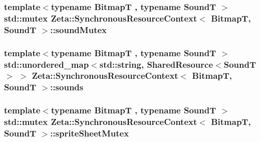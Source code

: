 \hypertarget{classZeta_1_1SynchronousResourceContext_aa7904efdbca71cf9c2bd5eb173f833c5}{
\subsubsection[{sound\+Mutex}]{\setlength{\rightskip}{0pt plus 5cm}template$<$typename Bitmap\+T , typename Sound\+T $>$ std\+::mutex {\bf Zeta\+::\+Synchronous\+Resource\+Context}$<$ Bitmap\+T, Sound\+T $>$\+::sound\+Mutex\hspace{0.3cm}{\ttfamily [private]}}}\label{classZeta_1_1SynchronousResourceContext_aa7904efdbca71cf9c2bd5eb173f833c5}
\hypertarget{classZeta_1_1SynchronousResourceContext_a22e87474e59bc81d6a2cfa5ee98e277e}{
\subsubsection[{sounds}]{\setlength{\rightskip}{0pt plus 5cm}template$<$typename Bitmap\+T , typename Sound\+T $>$ std\+::unordered\+\_\+map$<$std\+::string, {\bf Shared\+Resource}$<$Sound\+T$>$ $>$ {\bf Zeta\+::\+Synchronous\+Resource\+Context}$<$ Bitmap\+T, Sound\+T $>$\+::sounds\hspace{0.3cm}{\ttfamily [private]}}}\label{classZeta_1_1SynchronousResourceContext_a22e87474e59bc81d6a2cfa5ee98e277e}
\hypertarget{classZeta_1_1SynchronousResourceContext_a20f00d1c973bfd31be6d14ccfc1c0138}{
\subsubsection[{sprite\+Sheet\+Mutex}]{\setlength{\rightskip}{0pt plus 5cm}template$<$typename Bitmap\+T , typename Sound\+T $>$ std\+::mutex {\bf Zeta\+::\+Synchronous\+Resource\+Context}$<$ Bitmap\+T, Sound\+T $>$\+::sprite\+Sheet\+Mutex\hspace{0.3cm}{\ttfamily [private]}}}\label{classZeta_1_1SynchronousResourceContext_a20f00d1c973bfd31be6d14ccfc1c0138}
